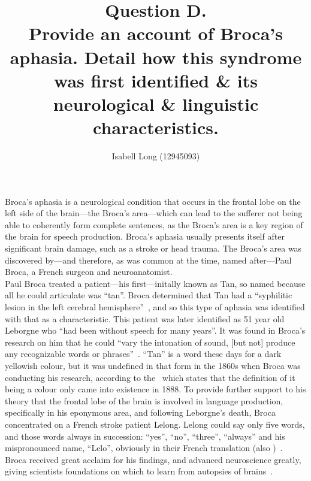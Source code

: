 \documentclass[12pt]{article}
\begin{document}
\title{Question D.\\
        \small{Provide an account of Broca's aphasia. Detail how this
               syndrome was first identified \& its neurological \& linguistic
               characteristics.}}
\author{Isabell Long (12945093)}
\maketitle

Broca's aphasia is a neurological condition that occurs in the frontal
lobe on the left side of the brain---the Broca's area---which can lead
to the sufferer not being able to coherently form complete sentences,
as the Broca's area is a key region of the brain for speech
production. Broca's aphasia usually presents itself after significant
brain damage, such as a stroke or head trauma. The Broca's area was
discovered by---and therefore, as was common at the time, named
after---Paul Broca, a French surgeon and neuroanatomist.\\

Paul Broca treated a patient---his first---initally known as Tan, so
named because all he could articulate was ``tan''.  Broca determined
that Tan had a ``syphilitic lesion in the left cerebral
hemisphere''~\cite{wikipedia-lesion}, and so this type of aphasia was
identified with that as a characteristic. This patient was later
identified as 51 year old Leborgne who ``had been without speech for
many years''. It was found in Broca's research on him that he could
``vary the intonation of sound, [but not] produce any recognizable
words or phrases''~\cite{tan-postmortem-imaging}. ``Tan'' is a word
these days for a dark yellowish colour, but it was undefined in that
form in the 1860s when Broca was conducting his research, according to
the~\citeauthor{oed-tan} which states that the definition of it being
a colour only came into existence in 1888. To provide further support
to his theory that the frontal lobe of the brain is involved in
language production, specifically in his eponymous area, and following
Leborgne's death, Broca concentrated on a French stroke patient Lelong.
Lelong could say only five words, and those words always in
succession: ``yes'', ``no'', ``three'', ``always'' and his mispronounced name,
``Lelo'', obviously in their French
translation (also
\citeauthor{tan-postmortem-imaging})~\cite{tan-postmortem-imaging}.
Broca received great acclaim for his findings, and advanced
neuroscience greatly, giving scientists foundations on which
to learn from autopsies of brains~\cite{broca-scientific-american}.\\
\end{document}
